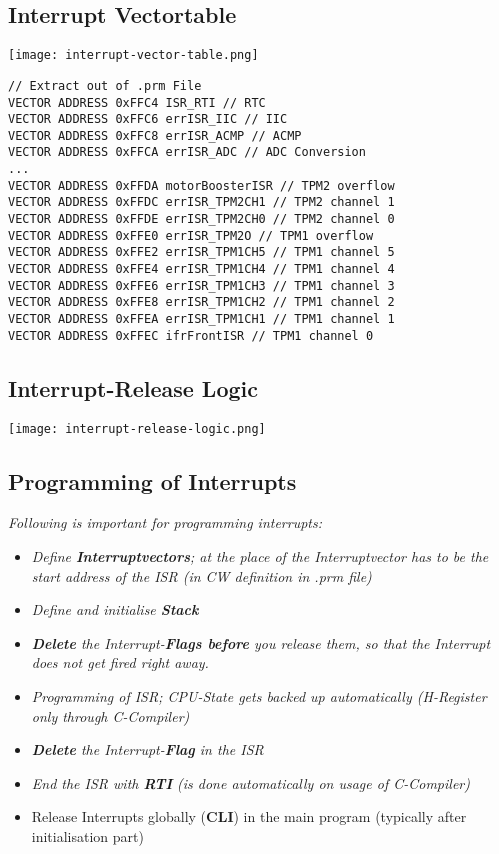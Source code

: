 \subsection{Interrupt Vectortable}

\texttt{[image: interrupt-vector-table.png]}

\begin{lstlisting}
// Extract out of .prm File
VECTOR ADDRESS 0xFFC4 ISR_RTI // RTC
VECTOR ADDRESS 0xFFC6 errISR_IIC // IIC
VECTOR ADDRESS 0xFFC8 errISR_ACMP // ACMP
VECTOR ADDRESS 0xFFCA errISR_ADC // ADC Conversion
...
VECTOR ADDRESS 0xFFDA motorBoosterISR // TPM2 overflow
VECTOR ADDRESS 0xFFDC errISR_TPM2CH1 // TPM2 channel 1
VECTOR ADDRESS 0xFFDE errISR_TPM2CH0 // TPM2 channel 0
VECTOR ADDRESS 0xFFE0 errISR_TPM2O // TPM1 overflow
VECTOR ADDRESS 0xFFE2 errISR_TPM1CH5 // TPM1 channel 5
VECTOR ADDRESS 0xFFE4 errISR_TPM1CH4 // TPM1 channel 4
VECTOR ADDRESS 0xFFE6 errISR_TPM1CH3 // TPM1 channel 3
VECTOR ADDRESS 0xFFE8 errISR_TPM1CH2 // TPM1 channel 2
VECTOR ADDRESS 0xFFEA errISR_TPM1CH1 // TPM1 channel 1
VECTOR ADDRESS 0xFFEC ifrFrontISR // TPM1 channel 0
\end{lstlisting}

\subsection{Interrupt-Release Logic}

\texttt{[image: interrupt-release-logic.png]}

\subsection{Programming of Interrupts}

\textit{Following is important for programming interrupts:}

\begin{itemize}
    \item{
        \textit{
            Define \textbf{Interruptvectors}; at the place of the Interruptvector
            has to be the start address of the ISR (in CW definition in .prm file)
        }
    }
    \item{
        \textit{
            Define and initialise \textbf{Stack}
        }
    }
    \item{
        \textit{
            \textbf{Delete} the Interrupt-\textbf{Flags before} you release them, so that the Interrupt
            does not get fired right away.
        }
    }
    \item{
        \textit{
            Programming of ISR; CPU-State gets backed up automatically (H-Register
            only through C-Compiler)
        }
    }
    \item{
        \textit{
            \textbf{Delete} the Interrupt-\textbf{Flag} in the ISR
        }
    }
    \item{
        \textit{
            End the ISR with \textbf{RTI} (is done automatically on usage of C-Compiler)
        }
    }
    \item{
        Release Interrupts globally (\textbf{CLI}) in the main program
        (typically after initialisation part)
    }
\end{itemize}

